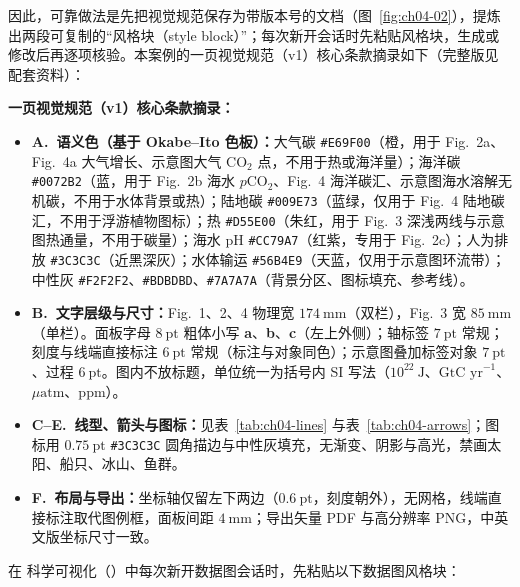 因此，可靠做法是先把视觉规范保存为带版本号的文档（图~\ref{fig:ch04-02}），提炼出两段可复制的“风格块（style block）”；每次新开会话时先粘贴风格块，生成或修改后再逐项核验。本案例的一页视觉规范（v1）核心条款摘录如下（完整版见配套资料）：

\begin{BookNote}
\textbf{一页视觉规范（v1）核心条款摘录：}
\begin{itemize}
\item \textbf{A.\ 语义色（基于 Okabe–Ito 色板）：}大气碳 \texttt{\#E69F00}（橙，用于 Fig.\ 2a、Fig.\ 4a 大气增长、示意图大气 $\text{CO}_2$ 点，不用于热或海洋量）；海洋碳 \texttt{\#0072B2}（蓝，用于 Fig.\ 2b 海水 $p\text{CO}_2$、Fig.\ 4 海洋碳汇、示意图海水溶解无机碳，不用于水体背景或热）；陆地碳 \texttt{\#009E73}（蓝绿，仅用于 Fig.\ 4 陆地碳汇，不用于浮游植物图标）；热 \texttt{\#D55E00}（朱红，用于 Fig.\ 3 深浅两线与示意图热通量，不用于碳量）；海水 pH \texttt{\#CC79A7}（红紫，专用于 Fig.\ 2c）；人为排放 \texttt{\#3C3C3C}（近黑深灰）；水体输运 \texttt{\#56B4E9}（天蓝，仅用于示意图环流带）；中性灰 \texttt{\#F2F2F2}、\texttt{\#BDBDBD}、\texttt{\#7A7A7A}（背景分区、图标填充、参考线）。
\item \textbf{B.\ 文字层级与尺寸：}Fig.\ 1、2、4 物理宽 $174\ \text{mm}$（双栏），Fig.\ 3 宽 $85\ \text{mm}$（单栏）。面板字母 $8\ \text{pt}$ 粗体小写 \textbf{a}、\textbf{b}、\textbf{c}（左上外侧）；轴标签 $7\ \text{pt}$ 常规；刻度与线端直接标注 $6\ \text{pt}$ 常规（标注与对象同色）；示意图叠加标签对象 $7\ \text{pt}$、过程 $6\ \text{pt}$。图内不放标题，单位统一为括号内 SI 写法（$10^{22}\ \text{J}$、$\text{GtC yr}^{-1}$、$\mu\text{atm}$、ppm）。
\item \textbf{C–E.\ 线型、箭头与图标：}见表~\ref{tab:ch04-lines} 与表~\ref{tab:ch04-arrows}；图标用 $0.75\ \text{pt}$ \texttt{\#3C3C3C} 圆角描边与中性灰填充，无渐变、阴影与高光，禁画太阳、船只、冰山、鱼群。
\item \textbf{F.\ 布局与导出：}坐标轴仅留左下两边（$0.6\ \text{pt}$，刻度朝外），无网格，线端直接标注取代图例框，面板间距 $4\ \text{mm}$；导出矢量 PDF 与高分辨率 PNG，中英文版坐标尺寸一致。
\end{itemize}
\end{BookNote}

在 \scidraw{} 科学可视化（）中每次新开数据图会话时，先粘贴以下数据图风格块：

